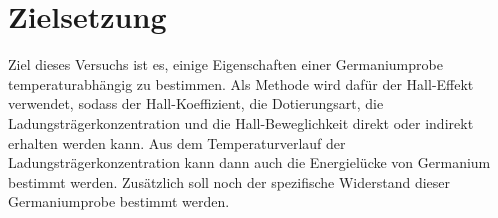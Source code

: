 \section{Zielsetzung}
Ziel dieses Versuchs ist es, einige Eigenschaften einer Germaniumprobe temperaturabhängig zu bestimmen. Als Methode wird dafür der Hall-Effekt verwendet, sodass der Hall-Koeffizient, die Dotierungsart, die Ladungsträgerkonzentration und die Hall-Beweglichkeit direkt oder indirekt erhalten werden kann. Aus dem Temperaturverlauf der Ladungsträgerkonzentration kann dann auch die Energielücke von Germanium bestimmt werden. Zusätzlich soll noch der spezifische Widerstand dieser Germaniumprobe bestimmt werden.

